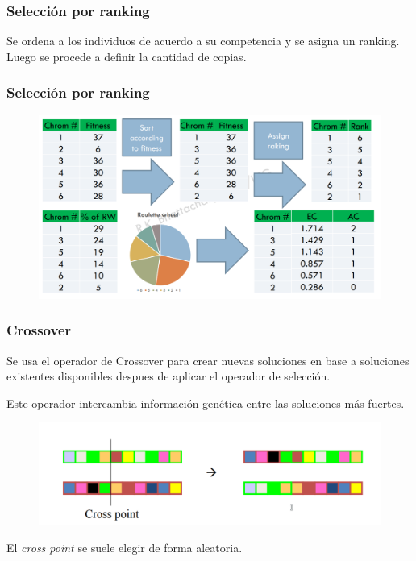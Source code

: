 \documentclass[10pt]{beamer}
\begin{document}
\begin{frame}
  \frametitle{Selección por ranking}
  Se ordena a los individuos de acuerdo a su competencia y se asigna un 
  ranking. Luego se procede a definir la cantidad de copias.
  

\end{frame}


\begin{frame}
  \frametitle{Selección por ranking}
  
  \begin{figure}[!h] 
    \centering
    \includegraphics[width=1\textwidth]{img/rank}
  \end{figure}

\end{frame}

\begin{frame}
  \frametitle{Crossover}

  Se usa el operador de Crossover para crear nuevas soluciones en base a 
  soluciones existentes disponibles despues de aplicar el operador de selección.

  Este operador intercambia información genética entre las soluciones más fuertes.

  \begin{figure}[!h] 
    \centering
    \includegraphics[width=1\textwidth]{img/cross}
  \end{figure}

  El \textit{cross point} se suele elegir de forma aleatoria.

\end{frame}
\end{document}

